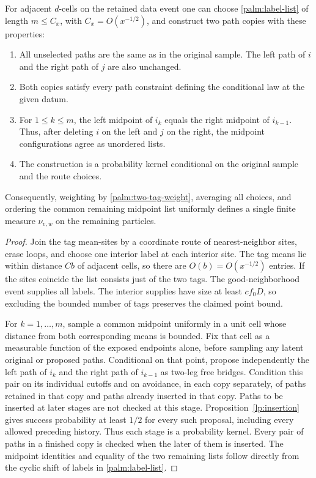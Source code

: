 \begin{lemma}
\label{palm:transport}
For adjacent $d$-cells on the retained data event one can choose
\eqref{palm:label-list} of length $m\le C_x$, with
$C_x=O(x^{-1/2})$, and construct two path copies with these properties:
\begin{enumerate}
\item All unselected paths are the same as in the original sample.
The left path of $i$ and the right path of $j$ are also unchanged.
\item Both copies satisfy every path constraint defining the
conditional law at the given datum.
\item For $1\le k\le m$, the left midpoint of $i_k$ equals the right
midpoint of $i_{k-1}$.  Thus, after deleting $i$ on the left and $j$
on the right, the midpoint configurations agree as unordered lists.
\item The construction is a probability kernel conditional on the
original sample and the route choices.
\end{enumerate}
Consequently, weighting by \eqref{palm:two-tag-weight}, averaging all
choices, and ordering the common remaining midpoint list uniformly
defines a single finite measure $\nu_{v,w}$ on the remaining particles.
\end{lemma}

\begin{proof}
Join the tag mean-sites by a coordinate route of nearest-neighbor sites,
erase loops, and choose one interior label at each interior site.
The tag means lie within distance $Cb$ of adjacent cells, so there are
$O(b)=O(x^{-1/2})$ entries.  If the sites coincide the list consists
just of the two tags.  The good-neighborhood event supplies all labels.
The interior supplies have size at least $cf_0D$, so excluding the
bounded number of tags preserves the claimed point bound.

For $k=1,\ldots,m$, sample a common midpoint uniformly in a unit cell
whose distance from both corresponding means is bounded.  Fix that cell
as a measurable function of the exposed endpoints alone, before sampling
any latent original or proposed paths.  Conditional
on that point, propose independently the left path of $i_k$ and the
right path of $i_{k-1}$ as two-leg free bridges.  Condition this pair
on its individual cutoffs and on avoidance, in each copy separately,
of paths retained in that copy and paths already inserted in that copy.
Paths to be inserted at later stages are not checked at this stage.
Proposition~\ref{lp:insertion} gives success probability at least $1/2$ for
every such proposal, including every allowed preceding history.
Thus each stage is a probability kernel.  Every pair of paths in a
finished copy is checked when the later of them is inserted.  The
midpoint identities and equality of the two remaining lists follow
directly from the cyclic shift of labels in \eqref{palm:label-list}.
\end{proof}

